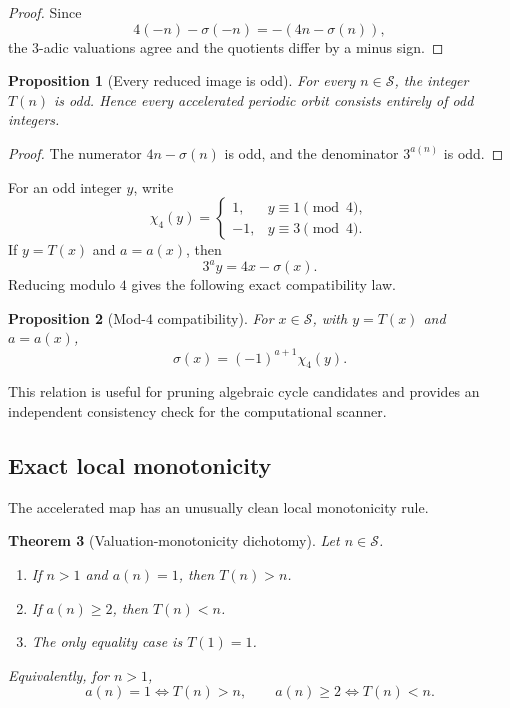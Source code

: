 \documentclass[11pt]{article}
\newtheorem{theorem}{Theorem}[section]
\newtheorem{proposition}[theorem]{Proposition}
\theoremstyle{definition}
\theoremstyle{remark}
\newcommand{\Sset}{\mathcal S}
\begin{document}
\begin{proof}
Since
\[
4(-n)-\sigma(-n)=-(4n-\sigma(n)),
\]
the $3$-adic valuations agree and the quotients differ by a minus sign.
\end{proof}

\begin{proposition}[Every reduced image is odd]
For every $n\in\Sset$, the integer $T(n)$ is odd.  Hence every accelerated periodic orbit consists entirely of odd integers.
\end{proposition}

\begin{proof}
The numerator $4n-\sigma(n)$ is odd, and the denominator $3^{a(n)}$ is odd.
\end{proof}

For an odd integer $y$, write
\[
\chi_4(y)=
\begin{cases}
1,&y\equiv1\pmod4,\\
-1,&y\equiv3\pmod4.
\end{cases}
\]
If $y=T(x)$ and $a=a(x)$, then
\[
3^a y=4x-\sigma(x).
\]
Reducing modulo $4$ gives the following exact compatibility law.

\begin{proposition}[Mod-$4$ compatibility]
For $x\in\Sset$, with $y=T(x)$ and $a=a(x)$,
\begin{equation}
\sigma(x)=(-1)^{a+1}\chi_4(y).
\label{eq:mod4-compatibility}
\end{equation}
\end{proposition}

This relation is useful for pruning algebraic cycle candidates and provides an independent consistency check for the computational scanner.

\subsection{Exact local monotonicity}

The accelerated map has an unusually clean local monotonicity rule.

\begin{theorem}[Valuation-monotonicity dichotomy]
Let $n\in\Sset$.
\begin{enumerate}[label=(\roman*),leftmargin=2em]
\item If $n>1$ and $a(n)=1$, then $T(n)>n$.
\item If $a(n)\ge2$, then $T(n)<n$.
\item The only equality case is $T(1)=1$.
\end{enumerate}
Equivalently, for $n>1$,
\[
a(n)=1\iff T(n)>n,
\qquad
a(n)\ge2\iff T(n)<n.
\]
\end{theorem}
\end{document}
